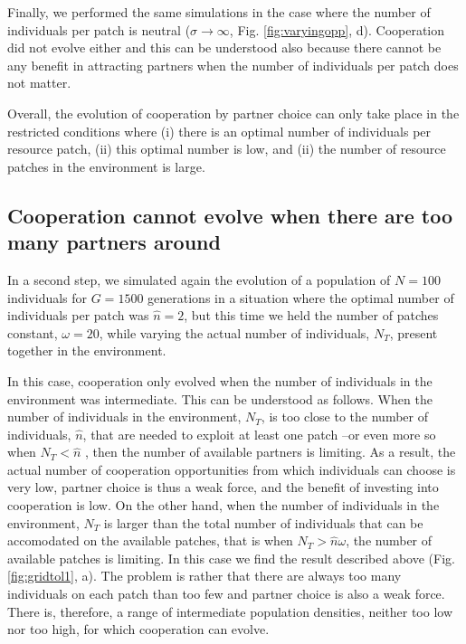 Finally, we performed the same simulations in the case where the number of individuals per patch is neutral ($\sigma \rightarrow \infty$, Fig. \ref{fig:varyingopp}, d). Cooperation did not evolve either and this can be understood also because there cannot be any benefit in attracting partners when the number of individuals per patch does not matter.

Overall, the evolution of cooperation by partner choice can only take place in the restricted conditions where (i) there is an optimal number of individuals per resource patch, (ii) this optimal number is low, and (ii) the number of resource patches in the environment is large.


\subsection{Cooperation cannot evolve when there are too many partners around}

In a second step, we simulated again the evolution of a population of $N=100$ individuals for $G=1500$ generations in a situation where the optimal number of individuals per patch was $\hat{n}=2$, but this time we held the number of patches constant, $\omega = 20$, while varying the actual number of individuals, $N_T$, present together in the environment.

In this case, cooperation only evolved when the number of individuals in the environment was intermediate. This can be understood as follows. When the number of individuals in the environment, $N_T$, is too close to the number of individuals, $\hat{n}$, that are needed to exploit at least one patch --or even more so when $N_T < \hat{n}$ , then the number of available partners is limiting. As a result, the actual number of cooperation opportunities from which individuals can choose is very low, partner choice is thus a weak force, and the benefit of investing into cooperation is low. On the other hand, when the number of individuals in the environment, $N_T$ is larger than the total number of individuals that can be accomodated on the available patches, that is when $N_T > \hat{n} \omega$, the number of available patches is limiting. In this case we find the result described above (Fig. \ref{fig:gridtol1}, a). The problem is rather that there are always too many individuals on each patch than too few and partner choice is also a weak force. There is, therefore, a range of intermediate population densities, neither too low nor too high, for which cooperation can evolve.

